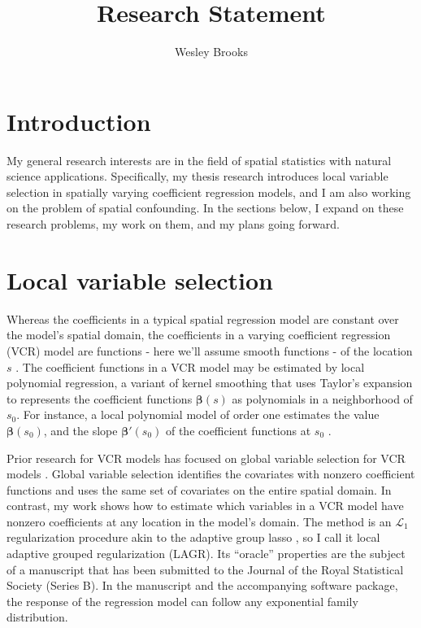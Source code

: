 \documentclass[12pt, oneside]{article}   	%
\title{Research Statement}
\author{Wesley Brooks}
\date{}							%
\begin{document}
\maketitle


\section*{Introduction}\label{introduction}

My general research interests are in the field of spatial statistics
with natural science applications. Specifically, my thesis research
introduces local variable selection in spatially varying coefficient
regression models, and I am also working on the problem of spatial
confounding. In the sections below, I expand on these research problems,
my work on them, and my plans going forward.

\section*{Local variable selection}\label{local-variable-selection}

Whereas the coefficients in a typical spatial regression model are
constant over the model's spatial domain, the coefficients in a varying
coefficient regression (VCR) model are functions - here we'll assume
smooth functions - of the location \(s\) \citep{Hastie-Tibshirani-1993}.
The coefficient functions in a VCR model may be estimated by local
polynomial regression, a variant of kernel smoothing that uses Taylor's
expansion to represents the coefficient functions \(\bm{\beta}(s)\) as
polynomials in a neighborhood of \(s_0\). For instance, a local
polynomial model of order one estimates the value \(\bm{\beta}(s_0)\),
and the slope \(\bm{\beta}'(s_0)\) of the coefficient functions at
\(s_0\) \citep{Fan-Gijbels-1996,Fan-Zhang-1999}.

Prior research for VCR models has focused on global variable selection
for VCR models \citep{Wang-Li-Huang-2008,Wang-Xia-2009,Wei-Huang-Li-2011}. Global variable selection identifies the
covariates with nonzero coefficient functions and uses the same set of
covariates on the entire spatial domain. In contrast, my work shows how
to estimate which variables in a VCR model have nonzero coefficients at
any location in the model's domain. The method is an
\(\mathcal{L}_1\) regularization procedure akin to the adaptive group
lasso \citep{Wang-Leng-2008}, so I call it local adaptive grouped
regularization (LAGR). Its ``oracle'' properties are the subject of a
manuscript that has been submitted to the Journal of the Royal
Statistical Society (Series B). In the manuscript and the accompanying
software package, the response of the regression model can follow any
exponential family distribution.
\end{document}
